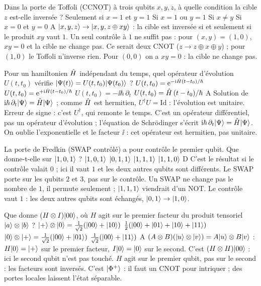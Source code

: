   {Dans la porte de Toffoli (CCNOT) à trois qubits $x,y,z$, à quelle condition la cible $z$ est-elle inversée ?}
  {Seulement si $x=1$ et $y=1$}
  {Si $x=1$ ou $y=1$}
  {Si $x\neq y$}
  {Si $x=0$ et $y=0$}
  {A}
\qcmx
  {$|x,y,z\rangle\to|x,y,z\oplus xy\rangle$ : la cible est inversée si et seulement si le produit $xy$ vaut $1$.}
  {Un seul contrôle à $1$ ne suffit pas : pour $(x,y)=(1,0)$, $xy=0$ et la cible ne change pas.}
  {Ce serait deux CNOT ($z\to z\oplus x\oplus y$) ; pour $(1,0)$ le Toffoli n'inverse rien.}
  {Pour $(0,0)$ on a $xy=0$ : la cible ne change pas.}

  {Pour un hamiltonien $\hat{H}$ indépendant du temps, quel opérateur d'évolution $U(t,t_0)$ vérifie $|\Psi(t)\rangle=U(t,t_0)|\Psi(t_0)\rangle$ ?}
  {$U(t,t_0)=\mathrm{e}^{-\mathrm{i}\hat{H}(t-t_0)/\hbar}$}
  {$U(t,t_0)=\mathrm{e}^{+\mathrm{i}\hat{H}(t-t_0)/\hbar}$}
  {$U(t,t_0)=-\ii\hbar\,\partial_t$}
  {$U(t,t_0)=\hat{H}\,(t-t_0)/\hbar$}
  {A}
\qcmx
  {Solution de $\mathrm{i}\hbar\,\partial_t|\Psi\rangle=\hat{H}|\Psi\rangle$ ; comme $\hat{H}$ est hermitien, $U^\dagger U=\mathrm{Id}$ : l'évolution est unitaire.}
  {Erreur de signe : c'est $U^\dagger$, qui remonte le temps.}
  {C'est un opérateur différentiel, pas un opérateur d'évolution ; l'équation de Schrödinger s'écrit $\mathrm{i}\hbar\,\partial_t|\Psi\rangle=\hat{H}|\Psi\rangle$.}
  {On oublie l'exponentielle et le facteur $\ii$ : cet opérateur est hermitien, pas unitaire.}

  {La porte de Fredkin (SWAP contrôlé) a pour contrôle le premier qubit. Que donne-t-elle sur $|1,0,1\rangle$ ?}
  {$|1,0,1\rangle$}
  {$|0,1,1\rangle$}
  {$|1,1,1\rangle$}
  {$|1,1,0\rangle$}
  {D}
\qcmx
  {C'est le résultat si le contrôle valait $0$ ; ici il vaut $1$ et les deux autres qubits sont différents.}
  {Le SWAP porte sur les qubits $2$ et $3$, pas sur le contrôle.}
  {Un SWAP ne change pas le nombre de $1$, il permute seulement ; $|1,1,1\rangle$ viendrait d'un NOT.}
  {Le contrôle vaut $1$ : les deux autres qubits sont échangés, $|0,1\rangle\to|1,0\rangle$.}

  {Que donne $(H\otimes I)|00\rangle$, où $H$ agit sur le premier facteur du produit tensoriel $|a\rangle\otimes|b\rangle$ ?}
  {$|+\rangle\otimes|0\rangle=\frac{1}{\sqrt2}(|00\rangle+|10\rangle)$}
  {$\frac12(|00\rangle+|01\rangle+|10\rangle+|11\rangle)$}
  {$|0\rangle\otimes|+\rangle=\frac{1}{\sqrt2}(|00\rangle+|01\rangle)$}
  {$\frac{1}{\sqrt2}(|00\rangle+|11\rangle)$}
  {A}
\qcmx
  {$(A\otimes B)(|u\rangle\otimes|v\rangle)=A|u\rangle\otimes B|v\rangle$ : $H|0\rangle=|+\rangle$ sur le premier facteur, $I|0\rangle=|0\rangle$ sur le second.}
  {C'est $(H\otimes H)|00\rangle$ : ici le second qubit n'est pas touché.}
  {$H$ agit sur le premier qubit, pas sur le second : les facteurs sont inversés.}
  {C'est $|\Phi^+\rangle$ : il faut un CNOT pour intriquer ; des portes locales laissent l'état séparable.}

